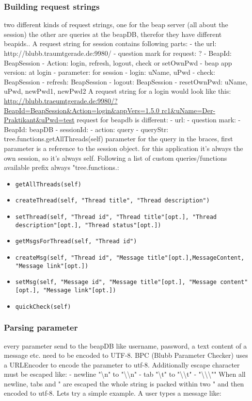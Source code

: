 \documentclass[12pt,a4paper,oneside]{report}
\newcommand{\code}[1]{\lstinline{#1}}
\begin{document}
\subsubsection{Building request strings}
two different kinds of request strings, one for the beap server (all about the session) the other are queries at the beapDB, therefor they have different beapids..
A request string for session contains following parts:
 	- the url: http://blubb.traumtgerade.de:9980/
 	- question mark for request: ?
 	- BeapId: BeapSession 
 	- Action: login, refresh, logout, check or setOwnPwd 
 	- beap app version: at login
 	- parameter: for session
 		- login: uName, uPwd
 		- check: BeapSession
 		- refresh: BeapSession
 		- logout: BeapSession
 		- resetOwnPwd: uName, uPwd, newPwd1, newPwd2
A request string for a login would look like this:
\url{http://blubb.traeumtgerade.de:9980/?BeapId=BeapSession&Action=login&appVers=1.5.0 rc1&uName=Der-Praktikant&uPwd=test}
request for beapdb is different:
	- url:
	- question mark:
	- BeapId: beapDB
	- sessionId:
	- action: query
	- queryStr: tree.functions.getAllThreads(self)
parameter for the query in the braces, first parameter is a reference to the session object. for this application it's always the own session, so it's always self.
Following a list of custom queries/functions available prefix always "tree.functions.:
\begin{itemize}
\item{\code{getAllThreads(self)}}
\item{\code{createThread(self, "Thread title", "Thread description")}}
\item{\code{setThread(self, "Thread id", "Thread title"[opt.], "Thread description"[opt.], "Thread status"[opt.])}}
\item{\code{getMsgsForThread(self, "Thread id")}}
\item{\code{createMsg(self, "Thread id", "Message title"[opt.],MessageContent, "Message link"[opt.])}}
\item{\code{setMsg(self, "Message id", "Message title"[opt.], "Message content"[opt.], "Message link"[opt.])}}
\item{\code{quickCheck(self)}}
\end{itemize}


 \subsubsection{Parsing parameter}
every parameter send to the beapDB like username, password, a text content of a message etc. need to be encoded to UTF-8.
BPC (Blubb Parameter Checker) uses a URLEncoder to encode the parameter to utf-8. 
Additionally escape character must be escaped like:
	- newline "\textbackslash n" to "\textbackslash \textbackslash n"
	- tab "\textbackslash t" to "\textbackslash \textbackslash t"
	- "\textbackslash \textbackslash \textbackslash ""
When all newline, tabs and " are escaped the whole string is packed within two " and then encoded to utf-8.
Lets try a simple example. A user types a message like:
\end{document}
